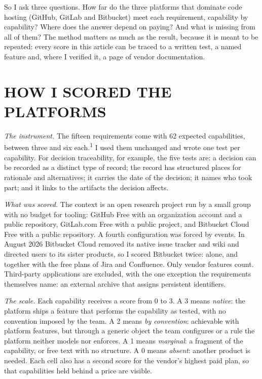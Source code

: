 \documentclass{IEEEcsmag}
\begin{document}
So I ask three questions. How far do the three platforms that dominate code hosting (GitHub, GitLab and Bitbucket) meet each requirement, capability by capability? Where does the answer depend on paying? And what is missing from all of them? The method matters as much as the result, because it is meant to be repeated: every score in this article can be traced to a written test, a named feature and, where I verified it, a page of vendor documentation.

\section{HOW I SCORED THE PLATFORMS}

\emph{The instrument.} The fifteen requirements come with 62 expected capabilities, between three and six each.\textsuperscript{1} I used them unchanged and wrote one test per capability. For decision traceability, for example, the five tests are: a decision can be recorded as a distinct type of record; the record has structured places for rationale and alternatives; it carries the date of the decision; it names who took part; and it links to the artifacts the decision affects.

\emph{What was scored.} The context is an open research project run by a small group with no budget for tooling: GitHub Free with an organization account and a public repository, GitLab.com Free with a public project, and Bitbucket Cloud Free with a public repository. A fourth configuration was forced by events. In August 2026 Bitbucket Cloud removed its native issue tracker and wiki and directed users to its sister products, so I scored Bitbucket twice: alone, and together with the free plans of Jira and Confluence. Only vendor features count. Third-party applications are excluded, with the one exception the requirements themselves name: an external archive that assigns persistent identifiers.

\emph{The scale.} Each capability receives a score from 0 to 3. A 3 means \emph{native}: the platform ships a feature that performs the capability as tested, with no convention imposed by the team. A 2 means \emph{by convention}: achievable with platform features, but through a generic object the team configures or a rule the platform neither models nor enforces. A 1 means \emph{marginal}: a fragment of the capability, or free text with no structure. A 0 means \emph{absent}: another product is needed. Each cell also has a second score for the vendor's highest paid plan, so that capabilities held behind a price are visible.
\end{document}
